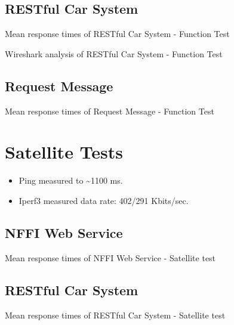 \begin{appendices}
\subsection{RESTful Car System}
\begin{table}[H]

\caption{Mean response times of RESTful Car System - Function Test}
\end{table}

\begin{table}[H]

\caption{Wireshark analysis of RESTful Car System - Function Test}

\end{table}


\subsection{Request Message}

\begin{table}[H]

\caption{Mean response times of Request Message - Function Test}
\end{table}


\section{Satellite Tests}

\begin{itemize}
	\item Ping measured to \textasciitilde 1100 ms.
	\item Iperf3 measured data rate: 402/291 Kbits/sec.
\end{itemize}

\subsection{NFFI Web Service}

\begin{table}[H]

\caption{Mean response times of NFFI Web Service - Satellite test}
\end{table}

\subsection{RESTful Car System}

\begin{table}[H]

\caption{Mean response times of RESTful Car System - Satellite test}
\end{table}


\end{appendices}
